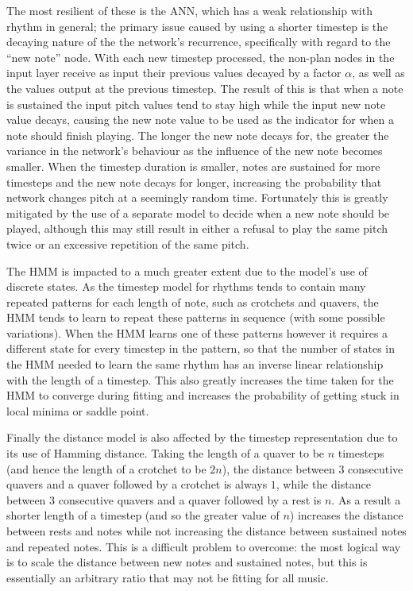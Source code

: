 \documentclass[ author={Stephen Livermore-Tozer},
				supervisor={Dr. Peter Flach},
				degree={MEng},
				title={Performing Algorithmic Co-composition Using Machine Learning},
				subtitle={},
				type={research},
				year={2016} ]{dissertation}
\begin{document}
	The most resilient of these is the ANN, which has a weak relationship with rhythm in general; the primary issue caused by using a shorter timestep is the decaying nature of the the network's recurrence, specifically with regard to the ``new note'' node. With each new timestep processed, the non-plan nodes in the input layer receive as input their previous values decayed by a factor $\alpha$, as well as the values output at the previous timestep. The result of this is that when a note is sustained the input pitch values tend to stay high while the input new note value decays, causing the new note value to be used as the indicator for when a note should finish playing. The longer the new note decays for, the greater the variance in the network's behaviour as the influence of the new note becomes smaller. When the timestep duration is smaller, notes are sustained for more timesteps and the new note decays for longer, increasing the probability that network changes pitch at a seemingly random time. Fortunately this is greatly mitigated by the use of a separate model to decide when a new note should be played, although this may still result in either a refusal to play the same pitch twice or an excessive repetition of the same pitch.
	
	The HMM is impacted to a much greater extent due to the model's use of discrete states. As the timestep model for rhythms tends to contain many repeated patterns for each length of note, such as crotchets and quavers, the HMM tends to learn to repeat these patterns in sequence (with some possible variations). When the HMM learns one of these patterns however it requires a different state for every timestep in the pattern, so that the number of states in the HMM needed to learn the same rhythm has an inverse linear relationship with the length of a timestep. This also greatly increases the time taken for the HMM to converge during fitting and increases the probability of getting stuck in local minima or saddle point. 
	
	Finally the distance model is also affected by the timestep representation due to its use of Hamming distance. Taking the length of a quaver to be $n$ timesteps (and hence the length of a crotchet to be $2n$), the distance between 3 consecutive quavers and a quaver followed by a crotchet is always $1$, while the distance between 3 consecutive quavers and a quaver followed by a rest is $n$. As a result a shorter length of a timestep (and so the greater value of $n$) increases the distance between rests and notes while not increasing the distance between sustained notes and repeated notes. This is a difficult problem to overcome: the most logical way is to scale the distance between new notes and sustained notes, but this is essentially an arbitrary ratio that may not be fitting for all music. 
\end{document}
